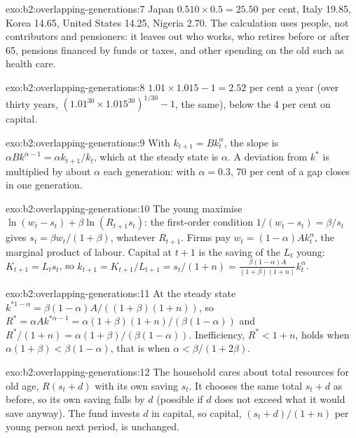 \begin{solution}{exo:b2:overlapping-generations:7}
Japan $0.510 \times 0.5 = 25.50$ per cent, Italy 19.85, Korea 14.65, United States 14.25, Nigeria 2.70. The calculation uses people, not contributors and pensioners: it
leaves out who works, who retires before or after 65, pensions financed by funds or taxes, and other spending on the old
such as health care.
\end{solution}

\begin{solution}{exo:b2:overlapping-generations:8}
$1.01 \times 1.015 - 1 = 2.52$ per cent a year (over thirty years, $(1.01^{30} \times 1.015^{30})^{1/30} - 1$, the same), below the 4 per cent on capital.
\end{solution}

\begin{solution}{exo:b2:overlapping-generations:9}
With $k_{t+1} = Bk_t^\alpha$, the slope is $\alpha Bk^{\alpha - 1} = \alpha k_{t+1}/k_t$, which at the steady state is $\alpha$. A deviation from $k^*$ is multiplied by about $\alpha$ each generation: with $\alpha = 0.3$, 70 per cent
of a gap closes in one generation.
\end{solution}

\begin{solution}{exo:b2:overlapping-generations:10}
The young maximise $\ln(w_t - s_t) + \beta\ln(R_{t+1}s_t)$: the first-order condition $1/(w_t - s_t) = \beta/s_t$ gives $s_t = \beta w_t/(1 + \beta)$, whatever $R_{t+1}$. Firms pay $w_t = (1 - \alpha)Ak_t^\alpha$, the marginal product of labour.
Capital at $t + 1$ is the saving of the $L_t$ young: $K_{t+1} = L_ts_t$, so $k_{t+1} = K_{t+1}/L_{t+1} = s_t/(1 + n) = \frac{\beta(1 - \alpha)A}{(1 + \beta)(1 + n)}k_t^\alpha$.
\end{solution}

\begin{solution}{exo:b2:overlapping-generations:11}
At the steady state $k^{*1-\alpha} = \beta(1 - \alpha)A/((1 + \beta)(1 + n))$, so $R^* = \alpha Ak^{*\alpha - 1} = \alpha(1 + \beta)(1 + n)/(\beta(1 - \alpha))$ and $R^*/(1 + n) = \alpha(1 + \beta)/(\beta(1 - \alpha))$. Inefficiency, $R^* < 1 + n$, holds when
$\alpha(1 + \beta) < \beta(1 - \alpha)$, that is when $\alpha < \beta/(1 + 2\beta)$.
\end{solution}

\begin{solution}{exo:b2:overlapping-generations:12}
The household cares about total resources for old age, $R(s_t + d)$ with its own saving $s_t$. It chooses the same total $s_t + d$ as before, so its own saving falls by $d$
(possible if $d$ does not exceed what it would save anyway). The fund invests $d$ in capital, so capital, $(s_t + d)/(1 + n)$ per young person next period, is unchanged.
\end{solution}

